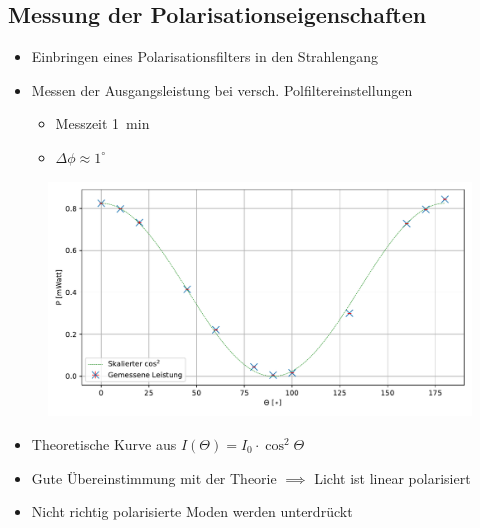 \documentclass[10pt, aspectratio=169]{beamer}
\begin{document}
\subsection{Messung der Polarisationseigenschaften}
\begin{frame}
  \begin{itemize}
  \item<1-> Einbringen eines Polarisationsfilters in den Strahlengang
  \item<2-> Messen der Ausgangsleistung bei
    versch. Polfiltereinstellungen
    \begin{itemize}
    \item Messzeit \SI{1}{\minute}
    \item \(\Delta\phi \approx 1^\circ\)
    \end{itemize}
  \end{itemize}
\end{frame}

\begin{frame}
  \begin{figure}[b]\centering
    \includegraphics[width=.8\columnwidth]{figs/malus.pdf}
  \end{figure}
  \begin{itemize}
  \item<1-> Theoretische Kurve aus
    \(I(\Theta)=I_0\cdot \cos^2{\Theta}\)
  \item<2-> Gute \"Ubereinstimmung mit der Theorie \(\implies\) Licht
    ist linear polarisiert
  \item<3-> Nicht richtig polarisierte Moden werden unterdr\"uckt
  \end{itemize}
\end{frame}
\end{document}
